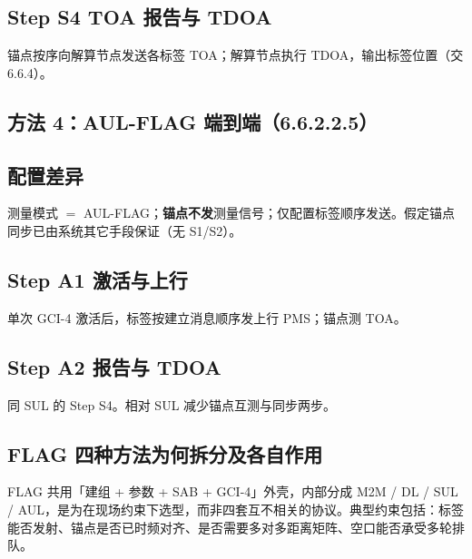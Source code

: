 \documentclass[11pt,a4paper]{ctexart}
\begin{document}
\subsection{Step S4 TOA 报告与 TDOA}

锚点按序向解算节点发送各标签 TOA；解算节点执行 TDOA，输出标签位置（交 6.6.4）。

\subsection{方法 4：AUL-FLAG 端到端（6.6.2.2.5）}

\subsection{配置差异}

测量模式 $=$ AUL-FLAG；\textbf{锚点不发}测量信号；仅配置标签顺序发送。假定锚点同步已由系统其它手段保证（无 S1/S2）。

\subsection{Step A1 激活与上行}

单次 GCI-4 激活后，标签按建立消息顺序发上行 PMS；锚点测 TOA。

\subsection{Step A2 报告与 TDOA}

同 SUL 的 Step S4。相对 SUL 减少锚点互测与同步两步。

\subsection{FLAG 四种方法为何拆分及各自作用}

FLAG 共用「建组 + 参数 + SAB + GCI-4」外壳，内部分成 M2M / DL / SUL / AUL，是为在现场约束下选型，而非四套互不相关的协议。典型约束包括：标签能否发射、锚点是否已时频对齐、是否需要多对多距离矩阵、空口能否承受多轮排队。
\end{document}

